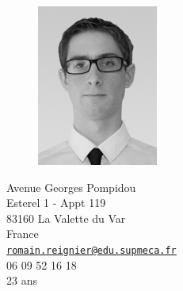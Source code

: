 \documentclass[a4paper,11pt,final]{memoir}
\begin{document}
\begin{figure}
	\hfill
	\includegraphics[width=0.5\columnwidth]{../IMG_7936-Modifier_cv}
	\vspace{-0.5cm}
\end{figure}

\begin{flushright}\small
	Avenue Georges Pompidou\\
	Esterel 1 - Appt 119\\
	83160 La Valette du Var\\
	France\\
	{\footnotesize\href{mailto:romain.reignier@edu.supmeca.fr}{\nolinkurl{romain.reignier@edu.supmeca.fr}}}\\
	06 09 52 16 18\\
	23 ans
\end{flushright}%
\end{document}
